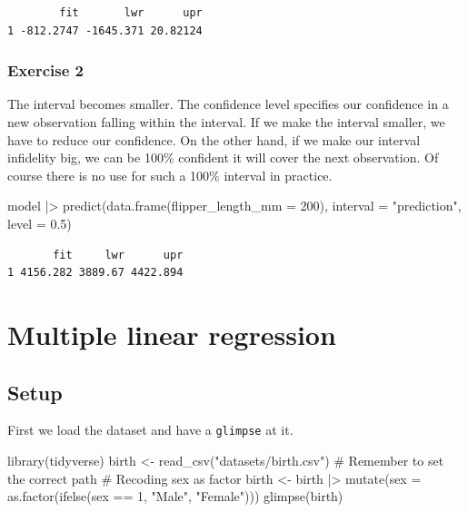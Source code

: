 \documentclass[
  letterpaper,
  DIV=11,
  numbers=noendperiod]{scrreprt}
\newenvironment{Shaded}{\begin{snugshade}}{\end{snugshade}}
\newcommand{\AttributeTok}[1]{\textcolor[rgb]{0.40,0.45,0.13}{#1}}
\newcommand{\CommentTok}[1]{\textcolor[rgb]{0.37,0.37,0.37}{#1}}
\newcommand{\DecValTok}[1]{\textcolor[rgb]{0.68,0.00,0.00}{#1}}
\newcommand{\FloatTok}[1]{\textcolor[rgb]{0.68,0.00,0.00}{#1}}
\newcommand{\FunctionTok}[1]{\textcolor[rgb]{0.28,0.35,0.67}{#1}}
\newcommand{\NormalTok}[1]{\textcolor[rgb]{0.00,0.23,0.31}{#1}}
\newcommand{\OtherTok}[1]{\textcolor[rgb]{0.00,0.23,0.31}{#1}}
\newcommand{\SpecialCharTok}[1]{\textcolor[rgb]{0.37,0.37,0.37}{#1}}
\newcommand{\StringTok}[1]{\textcolor[rgb]{0.13,0.47,0.30}{#1}}
\begin{document}
\begin{verbatim}
        fit       lwr      upr
1 -812.2747 -1645.371 20.82124
\end{verbatim}

\subsection{Exercise 2}\label{exercise-2-22}

The interval becomes smaller. The confidence level specifies our
confidence in a new observation falling within the interval. If we make
the interval smaller, we have to reduce our confidence. On the other
hand, if we make our interval infidelity big, we can be 100\% confident
it will cover the next observation. Of course there is no use for such a
100\% interval in practice.

\begin{Shaded}
\begin{Highlighting}[]
\NormalTok{model }\SpecialCharTok{|\textgreater{}} \FunctionTok{predict}\NormalTok{(}\FunctionTok{data.frame}\NormalTok{(}\AttributeTok{flipper\_length\_mm =} \DecValTok{200}\NormalTok{), }\AttributeTok{interval =} \StringTok{"prediction"}\NormalTok{, }\AttributeTok{level =} \FloatTok{0.5}\NormalTok{)}
\end{Highlighting}
\end{Shaded}

\begin{verbatim}
       fit     lwr      upr
1 4156.282 3889.67 4422.894
\end{verbatim}

\chapter{Multiple linear regression}\label{multiple-linear-regression}

\section{Setup}\label{setup-2}

First we load the dataset and have a \texttt{glimpse} at it.

\begin{Shaded}
\begin{Highlighting}[]
\FunctionTok{library}\NormalTok{(tidyverse)}
\NormalTok{birth }\OtherTok{\textless{}{-}} \FunctionTok{read\_csv}\NormalTok{(}\StringTok{"datasets/birth.csv"}\NormalTok{) }\CommentTok{\# Remember to set the correct path}
\CommentTok{\# Recoding sex as factor}
\NormalTok{birth }\OtherTok{\textless{}{-}}\NormalTok{ birth }\SpecialCharTok{|\textgreater{}}  \FunctionTok{mutate}\NormalTok{(}\AttributeTok{sex =} \FunctionTok{as.factor}\NormalTok{(}\FunctionTok{ifelse}\NormalTok{(sex }\SpecialCharTok{==} \DecValTok{1}\NormalTok{, }\StringTok{"Male"}\NormalTok{, }\StringTok{"Female"}\NormalTok{)))}
\FunctionTok{glimpse}\NormalTok{(birth)}
\end{Highlighting}
\end{Shaded}
\end{document}
